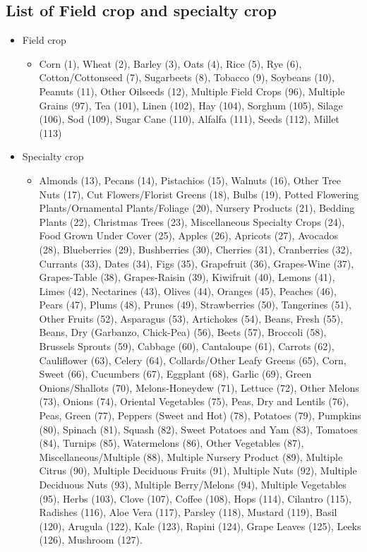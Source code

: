 \documentclass[12pt]{article}
\begin{document}
\begin{appendices}
\subsection*{List of Field crop and specialty crop}
\label{listfieldspecialty}
\begin{itemize}
    \item Field crop
      \begin{itemize}
          \item Corn (1), Wheat (2), Barley (3), Oats (4), Rice (5), Rye (6), Cotton/Cottonseed (7), Sugarbeets (8), Tobacco (9), Soybeans (10), Peanuts (11), Other Oilseeds (12), Multiple Field Crops (96), Multiple Grains (97), Tea (101), Linen (102), Hay (104), Sorghum (105), Silage (106), Sod (109), Sugar Cane (110), Alfalfa (111), Seeds (112), Millet (113)
      \end{itemize}
    \item Specialty crop
      \begin{itemize}
          \item Almonds (13), Pecans (14), Pistachios (15), Walnuts (16), Other Tree Nuts (17), Cut Flowers/Florist Greens (18), Bulbs (19), Potted Flowering Plants/Ornamental Plants/Foliage (20), Nursery Products (21), Bedding Plants (22), Christmas Trees (23), Miscellaneous Specialty Crops (24), Food Grown Under Cover (25), Apples (26), Apricots (27), Avocados (28), Blueberries (29), Bushberries (30), Cherries (31), Cranberries (32), Currants (33), Dates (34), Figs (35), Grapefruit (36), Grapes-Wine (37), Grapes-Table (38), Grapes-Raisin (39), Kiwifruit (40), Lemons (41), Limes (42), Nectarines (43), Olives (44), Oranges (45), Peaches (46), Pears (47), Plums (48), Prunes (49), Strawberries (50), Tangerines (51), Other Fruits (52), Asparagus (53), Artichokes (54), Beans, Fresh (55), Beans, Dry (Garbanzo, Chick-Pea) (56), Beets (57), Broccoli (58), Brussels Sprouts (59), Cabbage (60), Cantaloupe (61), Carrots (62), Cauliflower (63), Celery (64), Collards/Other Leafy Greens (65), Corn, Sweet (66), Cucumbers (67), Eggplant (68), Garlic (69), Green Onions/Shallots (70), Melons-Honeydew (71), Lettuce (72), Other Melons (73), Onions (74), Oriental Vegetables (75), Peas, Dry and Lentils (76), Peas, Green (77), Peppers (Sweet and Hot) (78), Potatoes (79), Pumpkins (80), Spinach (81), Squash (82), Sweet Potatoes and Yam (83), Tomatoes (84), Turnips (85), Watermelons (86), Other Vegetables (87), Miscellaneous/Multiple (88), Multiple Nursery Product (89), Multiple Citrus (90), Multiple Deciduous Fruits (91), Multiple Nuts (92), Multiple Deciduous Nuts (93), Multiple Berry/Melons (94), Multiple Vegetables (95), Herbs (103), Clove (107), Coffee (108), Hops (114), Cilantro (115), Radishes (116), Aloe Vera (117), Parsley (118), Mustard (119), Basil (120), Arugula (122), Kale (123), Rapini (124), Grape Leaves (125), Leeks (126), Mushroom (127).
      \end{itemize}
\end{itemize}



\end{appendices}
\end{document}
